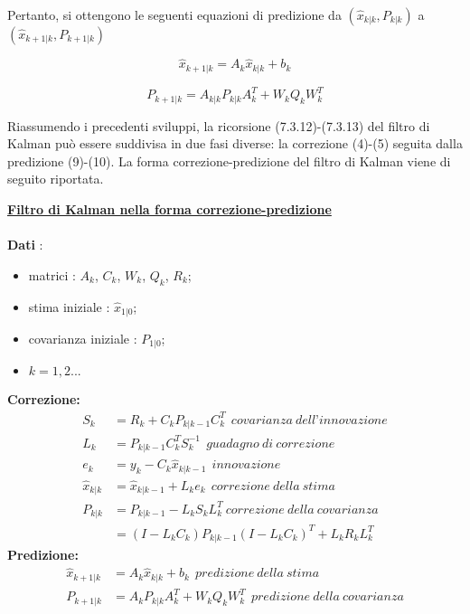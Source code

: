 Pertanto, si ottengono le seguenti equazioni di predizione da $(\hat{x}_{k|k},P_{k|k})$ a $(\hat{x}_{k+1|k},P_{k+1|k}) $

\begin{equation}
\hat{x}_{k+1|k}=A_k\hat{x}_{k|k}+b_k
\end{equation}


\begin{equation}
P_{k+1|k}=A_{k|k}P_{k|k}A_k^T+W_kQ_kW_k^T
\end{equation}

Riassumendo i precedenti sviluppi, la ricorsione (7.3.12)-(7.3.13) del filtro di Kalman può
essere suddivisa in due fasi diverse: la correzione (4)-(5) seguita dalla predizione
(9)-(10). La forma correzione-predizione del filtro di Kalman viene di seguito
riportata.
\newpage

\underline{\textbf{Filtro di Kalman nella forma correzione-predizione}}\\\\
\textbf{Dati} :
\begin{itemize}
\item matrici : $A_k$, $C_k$, $W_k$, $Q_k$, $R_k$;
\item stima iniziale : $\hat{x}_{1|0}$; 
\item covarianza iniziale : $P_{1|0}$;
\item $k=1,2... $
\end{itemize}
\textbf{Correzione:}
\begin{align}
S_k&=R_k+C_kP_{k|k-1}C_k^T ~~ covarianza~dell’innovazione \nonumber \\
L_k&=P_{k|k-1}C_k^TS_k^{-1}~~ guadagno~ di~ correzione \nonumber \\
e_k&=y_k-C_k\hat{x}_{k|k-1}~~ innovazione \nonumber \\
\hat{x}_{k|k}&=\hat{x}_{k|k-1}+L_ke_k~~ correzione ~della~ stima\nonumber\\
P_{k|k}&=P_{k|k-1}-L_kS_kL_k^T~ correzione ~della ~covarianza\nonumber\\
&=(I-L_kC_k)P_{k|k-1}(I-L_kC_k)^T+L_kR_kL_k^T\nonumber
\end{align}
\textbf{Predizione:}
\begin{align}
\hat{x}_{k+1|k}&=A_k\hat{x}_{k|k}+b_k~~ predizione~ della~ stima\nonumber\\
P_{k+1|k}&=A_kP_{k|k}A_k^T+W_kQ_kW_k^T~~ predizione~ della~ covarianza\nonumber
\end{align}

\newpage

\newpage